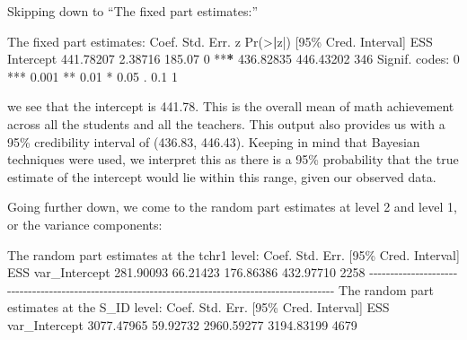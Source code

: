 \documentclass[
]{book}
\newenvironment{Shaded}{\begin{snugshade}}{\end{snugshade}}
\newcommand{\DecValTok}[1]{\textcolor[rgb]{0.00,0.00,0.81}{#1}}
\newcommand{\ErrorTok}[1]{\textcolor[rgb]{0.64,0.00,0.00}{\textbf{#1}}}
\newcommand{\FloatTok}[1]{\textcolor[rgb]{0.00,0.00,0.81}{#1}}
\newcommand{\FunctionTok}[1]{\textcolor[rgb]{0.00,0.00,0.00}{#1}}
\newcommand{\NormalTok}[1]{#1}
\newcommand{\SpecialCharTok}[1]{\textcolor[rgb]{0.00,0.00,0.00}{#1}}
\newcommand{\StringTok}[1]{\textcolor[rgb]{0.31,0.60,0.02}{#1}}
\begin{document}
Skipping down to ``The fixed part estimates:''

\begin{Shaded}
\begin{Highlighting}[]
\NormalTok{The fixed part estimates}\SpecialCharTok{:}  
\NormalTok{                Coef.   Std. Err.       z   }\FunctionTok{Pr}\NormalTok{(}\SpecialCharTok{\textgreater{}}\ErrorTok{|}\NormalTok{z}\SpecialCharTok{|}\NormalTok{)       [}\DecValTok{95}\NormalTok{\% Cred.   Interval]   ESS }
\NormalTok{Intercept   }\FloatTok{441.78207}     \FloatTok{2.38716}  \FloatTok{185.07}          \DecValTok{0}  \SpecialCharTok{**}\ErrorTok{*}   \FloatTok{436.82835}   \FloatTok{446.43202}   \DecValTok{346} 
\NormalTok{Signif. codes}\SpecialCharTok{:}  \DecValTok{0} \StringTok{\textquotesingle{}***\textquotesingle{}} \FloatTok{0.001} \StringTok{\textquotesingle{}**\textquotesingle{}} \FloatTok{0.01} \StringTok{\textquotesingle{}*\textquotesingle{}} \FloatTok{0.05} \StringTok{\textquotesingle{}.\textquotesingle{}} \FloatTok{0.1} \StringTok{\textquotesingle{} \textquotesingle{}} \DecValTok{1}  
\end{Highlighting}
\end{Shaded}

we see that the intercept is 441.78. This is the overall mean of math achievement across all the students and all the teachers. This output also provides us with a 95\% credibility interval of (436.83, 446.43). Keeping in mind that Bayesian techniques were used, we interpret this as there is a 95\% probability that the true estimate of the intercept would lie within this range, given our observed data.

Going further down, we come to the random part estimates at level 2 and level 1, or the variance components:

\begin{Shaded}
\begin{Highlighting}[]
\NormalTok{The random part estimates at the tchr1 level}\SpecialCharTok{:} 
\NormalTok{                    Coef.   Std. Err.   [}\DecValTok{95}\NormalTok{\% Cred.   Interval]    ESS }
\NormalTok{var\_Intercept   }\FloatTok{281.90093}    \FloatTok{66.21423}    \FloatTok{176.86386}   \FloatTok{432.97710}   \DecValTok{2258} 
\SpecialCharTok{{-}{-}{-}{-}{-}{-}{-}{-}{-}{-}{-}{-}{-}{-}{-}{-}{-}{-}{-}{-}{-}{-}{-}{-}{-}{-}{-}{-}{-}{-}{-}{-}{-}{-}{-}{-}{-}{-}{-}{-}{-}{-}{-}{-}{-}{-}{-}{-}{-}{-}{-}{-}{-}{-}{-}{-}{-}{-}{-}{-}{-}{-}{-}{-}{-}{-}{-}{-}{-}{-}{-}{-}{-}{-}{-}{-}{-}{-}{-}{-}{-}{-}{-}{-}{-}{-}{-}{-}{-}{-}{-}{-}{-}{-}{-}{-}{-}{-}{-}} 
\NormalTok{The random part estimates at the S\_ID level}\SpecialCharTok{:} 
\NormalTok{                     Coef.   Std. Err.   [}\DecValTok{95}\NormalTok{\% Cred.    Interval]    ESS }
\NormalTok{var\_Intercept   }\FloatTok{3077.47965}    \FloatTok{59.92732}   \FloatTok{2960.59277}   \FloatTok{3194.83199}   \DecValTok{4679} 
\end{Highlighting}
\end{Shaded}
\end{document}

